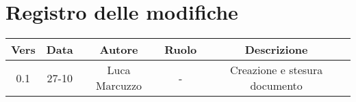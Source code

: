 \section{Registro delle modifiche}

\begin{table}[htbp]
	\begin{tabular}{|c|c|c|c|c|}
		\hline
		\rowcolor[gray]{0.9}
		Vers & Data & Autore & Ruolo & Descrizione \\
		\hline
		0.1 & 27-10 & Luca Marcuzzo & - & Creazione e stesura documento \\
		\hline
	\end{tabular}
\end{table}